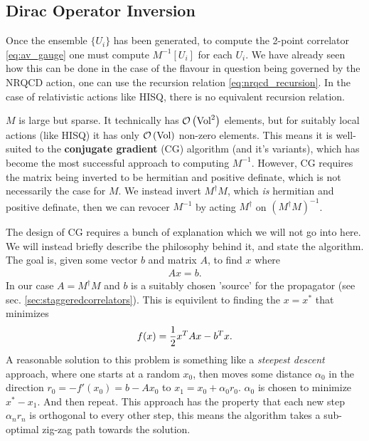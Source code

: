 \subsection{Dirac Operator Inversion}
\label{sec:inversions}

Once the ensemble $\{U_i\}$ has been generated, to compute the 2-point correlator \eqref{eq:av_gauge} one must compute $M^{-1}[U_i]$ for each $U_i$. We have already seen how this can be done in the case of the flavour in question being governed by the NRQCD action, one can use the recursion relation \eqref{eq:nrqcd_recursion}. In the case of relativistic actions like HISQ, there is no equivalent recursion relation.

$M$ is large but sparse. It technically has $\mathcal{O}\left( \text{Vol}^2 \right)$ elements, but for suitably local actions (like HISQ) it has only $\mathcal{O}\left( \text{Vol} \right)$ non-zero elements. This means it is well-suited to the {\bf{conjugate gradient}} (CG) algorithm \cite{Hestenes&Stiefel:1952} (and it's variants), which has become the most successful approach to computing $M^{-1}$. However, CG requires the matrix being inverted to be hermitian and positive definate, which is not necessarily the case for $M$. We instead invert $M^{\dagger}M$, which {\it{is}} hermitian and positive definate, then we can revocer $M^{-1}$ by acting $M^{\dagger}$ on $(M^{\dagger}M)^{-1}$.

The design of CG requires a bunch of explanation which we will not go into here. We will instead briefly describe the philosophy behind it, and state the algorithm. The goal is, given some vector $b$ and matrix $A$, to find $x$ where
\begin{align}
  Ax = b.
\end{align}
In our case $A=M^{\dagger}M$ and $b$ is a suitably chosen 'source' for the propagator (see sec. \ref{sec:staggeredcorrelators}). This is equivilent to finding the $x=x^*$ that minimizes
\begin{align}
  f(x) = {1\over2}x^TAx - b^Tx.
\end{align}
A reasonable solution to this problem is something like a {\it{steepest descent}} approach, where one starts at a random $x_0$, then moves some distance $\alpha_0$ in the direction $r_0 = -f'(x_0) = b-Ax_0$ to $x_1=x_0+\alpha_0 r_0$. $\alpha_0$ is chosen to minimize $x^*-x_1$. And then repeat. This approach has the property that each new step $\alpha_n r_n$ is orthogonal to every other step, this means the algorithm takes a sub-optimal zig-zag path towards the solution.

